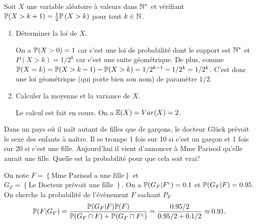 \documentclass[a4paper]{tp_um}
\begin{document}
\exo{} Soit $X$ une variable aléatoire à valeurs dans $\N^{*}$ et vérifiant $\P(X > k+1) = \frac 1 2 \P\left( X > k \right)$ pour tout $k\in\N$. 
\begin{enumerate}
    \item Déterminer la loi de $X$.

        \bigskip
        On a $\P(X > 0) = 1$ car c'est une loi de probabilité dont le support est $\N^{*}$ et $P(X > k) = 1/2^{k}$ car c'est une suite géométrique.  De plus, comme $\P(X=k) = \P(X >k-1) - \P(X> k) = 1/2^{k-1} - 1/2^{k} = 1 / 2^{k}$. C'est donc une loi géométrique (qui porte bien son nom) de paramètre $1/2$.
        \bigskip

    \item Calculer la moyenne et la variance de $X$.

        \bigskip
        Le calcul est fait en cours. On a $\E(X) = Var(X) = 2$.
        \bigskip
\end{enumerate} %


\exo{} Dans un pays où il naît autant de filles que de garçons, le docteur Glück prévoit le sexe des enfants à naître. Il se trompe 1 fois sur 10 si c'est un garçon et 1 fois sur 20 si c'est une fille. Aujourd'hui il vient d'annoncer à Mme Parisod qu'elle aurait une fille. Quelle est la probabilité pour que cela soit vrai?  %

\bigskip
On note $F=\left\{ \text{Mme Parisod a une fille} \right\}$ et $G_F =\left\{ \text{Le Docteur prévoit une fille } \right\}  $. On a $\P(G_F|F^c) = 0.1$ et $\P(G_F|F) = 0.95$. On cherche la probabilité de l'évènement $F$ sachant $P_F$ 
\[
    \P(F | G_F) = \frac{ \P( G_F | F) \P(F)}{\P(G_F \cap F) + \P(G_F \cap F^c)} = \frac{ 0.95 /2 }{ 0.95/2 + 0.1/2 } \approx 0.91.
\]
\bigskip

\end{document}
